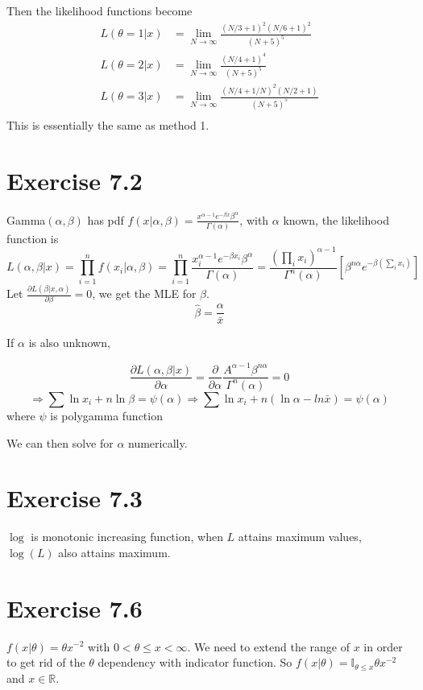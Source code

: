 \documentclass[12pt]{article}
\begin{document}
 Then the likelihood functions become 
 \begin{equation*}
 	\begin{split}
     L(\theta=1|x) &= \lim_{N \rightarrow \infty}\frac{(N/3 + 1)^2(N/6 + 1)^2}{(N + 5)^5} \\
 	L(\theta=2|x) &= \lim_{N \rightarrow \infty}\frac{(N/4 + 1)^4}{(N + 5)^5} \\
 	L(\theta=3|x) &= \lim_{N \rightarrow \infty}\frac{(N/4 + 1/ N)^2(N/2 + 1)}{(N + 5)^5} \\
 	\end{split}
 \end{equation*}
This is essentially the same as method 1.


\section*{Exercise 7.2}
 Gamma$(\alpha, \beta)$ has pdf $f(x|\alpha, \beta) = \frac{x^{\alpha - 1} e^{-\beta x} \beta^\alpha}{\Gamma(\alpha)}$, with $\alpha$ known, the likelihood function is $$
   L(\alpha, \beta|x) = \prod^n_{i=1} f(x_i |\alpha, \beta) 
   = \prod^n_{i=1}\frac{x_i^{\alpha - 1} e^{-\beta x_i}\beta^\alpha}{\Gamma(\alpha)} = \frac{(\prod_i x_i)^{\alpha - 1}}{\Gamma^n(\alpha)} \left[ \beta^{n \alpha} e^{- \beta (\sum_i x_i)}\right]
 $$
 Let $\frac{\partial L(\beta|x, \alpha)}{\partial \beta} = 0$, we get the MLE for $\beta$. $$\hat{\beta} = \frac{\alpha}{\bar{x}}$$
 
If $\alpha$ is also unknown,

$$
  \frac{\partial L(\alpha, \beta |x)}{\partial \alpha} =  
  \frac{\partial}{\partial \alpha}  \frac{A^{\alpha - 1}  \beta^{n \alpha}}{\Gamma^n(\alpha)} = 0 $$ 
$$
  \Rightarrow  \sum \ln x_i + n \ln \beta = \psi (\alpha)
   \Rightarrow \sum \ln x_i + n (\ln \alpha - ln \bar{x}) = \psi (\alpha)
$$
 where $\psi$ is polygamma function

We can then solve for $\alpha$ numerically.

\section*{Exercise 7.3}
$\log$ is monotonic increasing function, when $L$ attains maximum values, $\log (L)$ also attains maximum.


\section*{Exercise 7.6}
$f(x|\theta) = \theta x^{-2}$ with $0 < \theta \leq x < \infty$. We need to extend the range of $x$ in order to get rid of the $\theta$ dependency with indicator function. So $f(x | \theta) =  \mathbb{I}_{\theta \leq x} \theta x^{-2}$ and $x \in \mathbb{R}$. 
\end{document}
